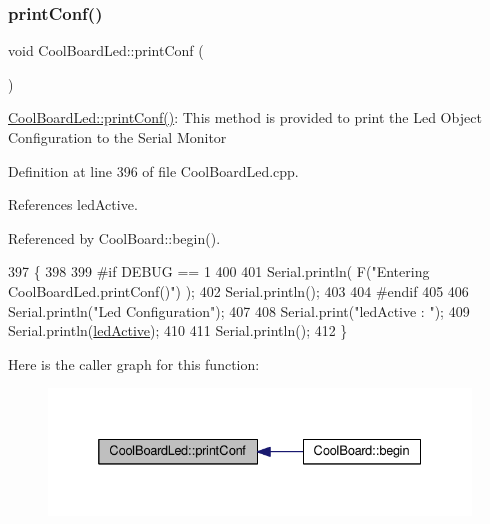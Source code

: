 \subsubsection{\texorpdfstring{print\+Conf()}{printConf()}}
{\footnotesize\ttfamily void Cool\+Board\+Led\+::print\+Conf (\begin{DoxyParamCaption}{ }\end{DoxyParamCaption})}

\hyperlink{classCoolBoardLed_a8ed3053a36f0ed4a131f43b5b17efb61}{Cool\+Board\+Led\+::print\+Conf()}\+: This method is provided to print the Led Object Configuration to the Serial Monitor 

Definition at line 396 of file Cool\+Board\+Led.\+cpp.



References led\+Active.



Referenced by Cool\+Board\+::begin().


\begin{DoxyCode}
397 \{
398 
399 \textcolor{preprocessor}{#if DEBUG == 1 }
400 
401     Serial.println( F(\textcolor{stringliteral}{"Entering CoolBoardLed.printConf()"}) );
402     Serial.println();
403 
404 \textcolor{preprocessor}{#endif}
405 
406     Serial.println(\textcolor{stringliteral}{"Led Configuration"});
407 
408     Serial.print(\textcolor{stringliteral}{"ledActive : "});
409     Serial.println(\hyperlink{classCoolBoardLed_a5f17c135516fcf4b44ea8a096ba0177a}{ledActive});
410 
411     Serial.println();   
412 \}
\end{DoxyCode}
Here is the caller graph for this function\+:
\nopagebreak
\begin{figure}[H]
\begin{center}
\leavevmode
\includegraphics[width=332pt]{classCoolBoardLed_a8ed3053a36f0ed4a131f43b5b17efb61_icgraph}
\end{center}
\end{figure}
\mbox{\label{classCoolBoardLed_ad5f0de4c628cbfbf49896042831c64ad}} 

